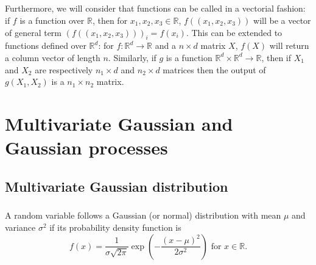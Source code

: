 \documentclass[twoside,openright]{report}
\newcommand\PS[2]{\left \langle #1 \right \rangle_{#2}}
\begin{document}
\paragraph{}
Furthermore, we will consider that functions can be called in a vectorial fashion: if $f$ is a function over $\mathds{R}$, then for $x_1,x_2,x_3 \in \mathds{R}$, $f((x_1,x_2,x_3))$ will be a vector of general term $(f((x_1,x_2,x_3)))_i = f(x_i)$. This can be extended to functions defined over $\mathds{R}^d$: for $f: \mathds{R}^d \rightarrow \mathds{R}$ and a $n \times d$ matrix $X$, $f(X)$ will return a column vector of length $n$. Similarly, if $g$ is a function $\mathds{R}^d \times \mathds{R}^d \rightarrow \mathds{R}$, then if $X_1$ and $X_2$ are respectively $n_1 \times d$ and $n_2 \times d$ matrices then the output of $g(X_1,X_2)$ is a $n_1 \times n_2$ matrix.


\chapter{Multivariate Gaussian and Gaussian processes}

\section{Multivariate Gaussian distribution}

\paragraph{}
A random variable follows a Gaussian (or normal) distribution with mean $\mu$ and variance $\sigma^2$ if its probability density function is
\begin{equation}
f(x) = \frac{1}{\sigma \sqrt{2 \pi}} \exp \left(-\frac{(x-\mu)^2}{2 \sigma^2} \right) \text{ for } x \in \mathds{R}.
\end{equation}  
\end{document}
